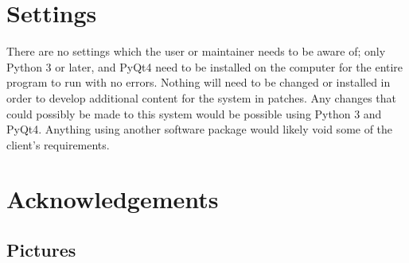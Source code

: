 \section{Settings}

There are no settings which the user or maintainer needs to be aware of; only Python 3 or later, and PyQt4 need to be installed on the computer for the entire program to run with no errors. Nothing will need to be changed or installed in order to develop additional content for the system in patches. Any changes that could possibly be made to this system would be possible using Python 3 and PyQt4. Anything using another software package would likely void some of the client's requirements.

\section{Acknowledgements}

\subsection{Pictures}


